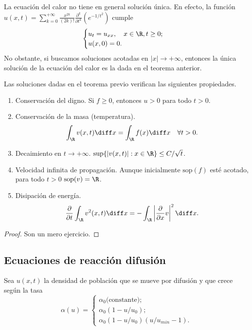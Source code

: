 \documentclass{article}
\begin{document}
\begin{remark}
  La ecuación del calor no tiene en general solución única. En efecto, la función
  $u(x,t) = \sum_{k=0}^{+\infty} \frac{x^{2k}}{(2k)!} \frac{\partial^k}{\partial t^k}\left(
    e^{-1/t^2} \right)$ cumple
  \begin{equation}
    \label{eq:calor:5}
    \begin{cases}
      u_t = u_{xx}, \quad x \in \R, t \ge 0;\\
      u(x, 0) = 0.
    \end{cases}
  \end{equation}
  No obstante, si buscamos soluciones acotadas en $|x| \to +\infty$, entonces la única solución de
  la ecuación del calor es la dada en el teorema anterior.
\end{remark}

  
\begin{proposition}
  Las soluciones dadas en el teorema previo verifican las siguientes propiedades.
  \begin{enumerate}
  \item Conservación del digno. Si $f \ge 0$, entonces $u > 0$ para todo $t > 0$.
  \item Conservación de la masa (temperatura).
    \[ \int_{\R} v(x,t) \diff x = \int_{\R} f(x) \diff x \quad \forall t >0. \]
  \item Decaimiento en $t \to +\infty$. $\sup \{|v(x,t)| : x \in \R\} \le C / \sqrt{t}$.
  \item Velocidad infinita de propagación. Aunque inicialmente $\mathrm{sop}(f)$ esté acotado, para
    todo $t > 0$ $\mathrm{sop}(v) = \R$.
  \item Disipación de energía.
    \[ \frac{\partial}{\partial t}\int_{\R} v^2(x,t) \diff x = - \int_{\R} \left|
        \frac{\partial}{\partial x}v \right|^2 \diff x. \]
  \end{enumerate}
\end{proposition}
\begin{proof}
  Son un mero ejercicio.
\end{proof}

\subsection{Ecuaciones de reacción difusión}

Sea $u(x,t)$ la densidad de población que se mueve por difusión y que crece según la tasa
\[\alpha(u) =
  \begin{cases}
    \alpha_0 \text{(constante)}; \\
    \alpha_0 (1 - u / u_0); \\
    \alpha_0 (1 - u / u_0) (u / u_{min} -1).
  \end{cases}
\]
\end{document}

